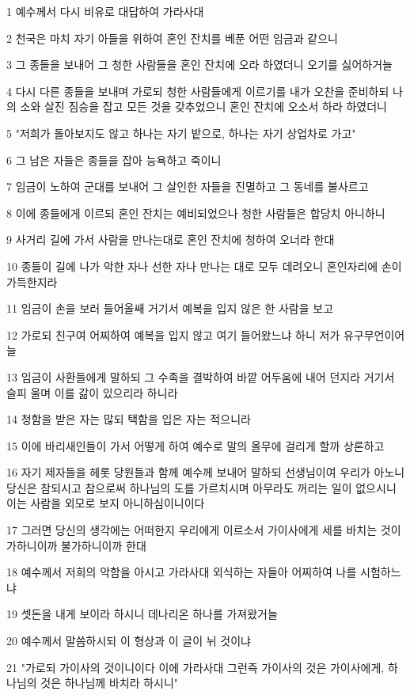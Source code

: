 \par 1 예수께서 다시 비유로 대답하여 가라사대
\par 2 천국은 마치 자기 아들을 위하여 혼인 잔치를 베푼 어떤 임금과 같으니
\par 3 그 종들을 보내어 그 청한 사람들을 혼인 잔치에 오라 하였더니 오기를 싫어하거늘
\par 4 다시 다른 종들을 보내며 가로되 청한 사람들에게 이르기를 내가 오찬을 준비하되 나의 소와 살진 짐승을 잡고 모든 것을 갖추었으니 혼인 잔치에 오소서 하라 하였더니
\par 5 "저희가 돌아보지도 않고 하나는 자기 밭으로, 하나는 자기 상업차로 가고"
\par 6 그 남은 자들은 종들을 잡아 능욕하고 죽이니
\par 7 임금이 노하여 군대를 보내어 그 살인한 자들을 진멸하고 그 동네를 불사르고
\par 8 이에 종들에게 이르되 혼인 잔치는 예비되었으나 청한 사람들은 합당치 아니하니
\par 9 사거리 길에 가서 사람을 만나는대로 혼인 잔치에 청하여 오너라 한대
\par 10 종들이 길에 나가 악한 자나 선한 자나 만나는 대로 모두 데려오니 혼인자리에 손이 가득한지라
\par 11 임금이 손을 보러 들어올쌔 거기서 예복을 입지 않은 한 사람을 보고
\par 12 가로되 친구여 어찌하여 예복을 입지 않고 여기 들어왔느냐 하니 저가 유구무언이어늘
\par 13 임금이 사환들에게 말하되 그 수족을 결박하여 바깥 어두움에 내어 던지라 거기서 슬피 울며 이를 갊이 있으리라 하니라
\par 14 청함을 받은 자는 많되 택함을 입은 자는 적으니라
\par 15 이에 바리새인들이 가서 어떻게 하여 예수로 말의 올무에 걸리게 할까 상론하고
\par 16 자기 제자들을 헤롯 당원들과 함께 예수께 보내어 말하되 선생님이여 우리가 아노니 당신은 참되시고 참으로써 하나님의 도를 가르치시며 아무라도 꺼리는 일이 없으시니 이는 사람을 외모로 보지 아니하심이니이다
\par 17 그러면 당신의 생각에는 어떠한지 우리에게 이르소서 가이사에게 세를 바치는 것이 가하니이까 불가하니이까 한대
\par 18 예수께서 저희의 악함을 아시고 가라사대 외식하는 자들아 어찌하여 나를 시험하느냐
\par 19 셋돈을 내게 보이라 하시니 데나리온 하나를 가져왔거늘
\par 20 예수께서 말씀하시되 이 형상과 이 글이 뉘 것이냐
\par 21 "가로되 가이사의 것이니이다 이에 가라사대 그런즉 가이사의 것은 가이사에게, 하나님의 것은 하나님께 바치라 하시니"
